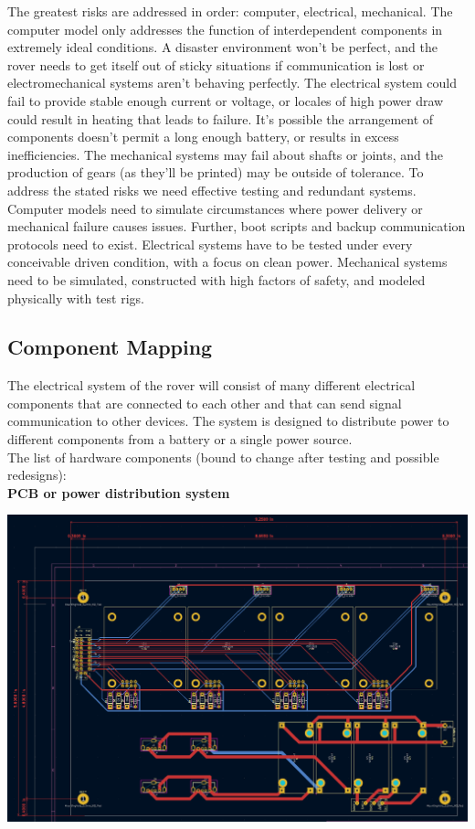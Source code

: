 \documentclass[a4paper, 10pt]{article}
\begin{document}
	The greatest risks are addressed in order: computer, electrical, mechanical. The computer model only addresses the function of interdependent components in extremely ideal conditions. A disaster environment won't be perfect, and the rover needs to get itself out of sticky situations if communication is lost or electromechanical systems aren't behaving perfectly. The electrical system could fail to provide stable enough current or voltage, or locales of high power draw could result in heating that leads to failure. It's possible the arrangement of components doesn't permit a long enough battery, or results in excess inefficiencies. The mechanical systems may fail about shafts or joints, and the production of gears (as they'll be printed) may be outside of tolerance.
	To address the stated risks we need effective testing and redundant systems. Computer models need to simulate circumstances where power delivery or mechanical failure causes issues. Further, boot scripts and backup communication protocols need to exist. Electrical systems have to be tested under every conceivable driven condition, with a focus on clean power. Mechanical systems need to be simulated, constructed with high factors of safety, and modeled physically with test rigs.
 	
 	\subsection{Component Mapping}
 	The electrical system of the rover will consist of many different electrical components that are connected to each other and that can send signal communication to other devices. The system is designed to distribute power to different components from a battery or a single power source. \\
	
The list of hardware components (bound to change after testing and possible redesigns): \\

\textbf{PCB or power distribution system}

\includegraphics[scale=0.15]{Rover PCB}
\end{document}
